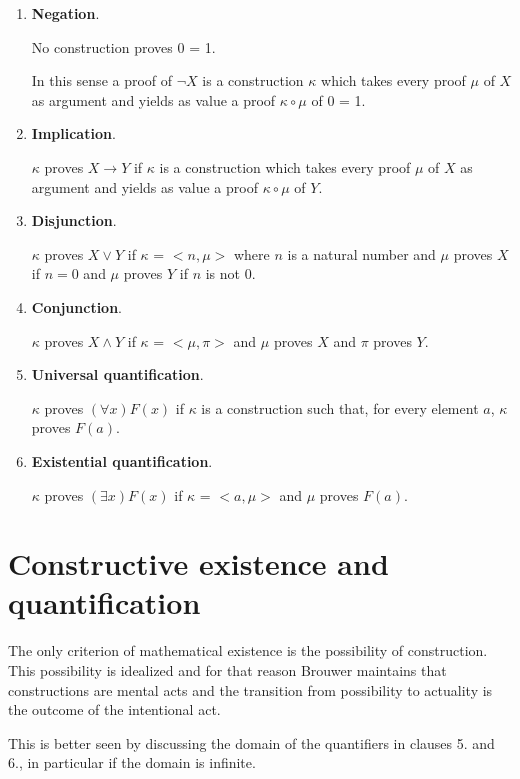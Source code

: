 \documentclass[12pt]{article}
\begin{document}
\begin{enumerate}
\item \textbf{Negation}. 

No construction proves 0 = 1. 

In this sense a proof of $\neg X$ is a construction $\kappa$ which takes every proof $\mu$ of $X$ as argument and yields as value a proof $\kappa \circ \mu$ of 0 = 1.

\item \textbf{Implication}.

$\kappa$ proves $X \rightarrow Y$ if $\kappa$ is a construction which takes every proof $\mu$ of $X$ as argument and yields as value a proof $\kappa \circ \mu$ of $Y$.

\item \textbf{Disjunction}.

$\kappa$ proves $X \vee Y$ if $\kappa$ = $< n, \mu>$ where $n$ is a natural number and $\mu$ proves $X$ if $n = 0$ and $\mu$ proves $Y$ if $n$ is not 0.

\item \textbf{Conjunction}.

$\kappa$ proves $X \wedge Y$ if $\kappa$ = $<\mu, \pi>$ and $\mu$ proves $X$ and $\pi$ proves $Y$.

\item \textbf{Universal quantification}.

$\kappa$ proves $(\forall x) F (x)$ if  $\kappa$ is a construction such that, for every element $a$, $\kappa$ proves $F (a)$.

\item \textbf{Existential quantification}.

$\kappa$ proves $(\exists x) F (x)$ if $\kappa$ = $<a, \mu>$ and $\mu$ proves $F (a)$.

\end{enumerate}

\section{Constructive existence and quantification}\normalsize

The only criterion of mathematical existence is the possibility of construction. This possibility is idealized and for that reason Brouwer maintains that constructions are mental acts and the transition from possibility to actuality is the outcome of the intentional act.

This is better seen by discussing the domain of the quantifiers in clauses 5. and 6., in particular if the domain is infinite.
\end{document}
